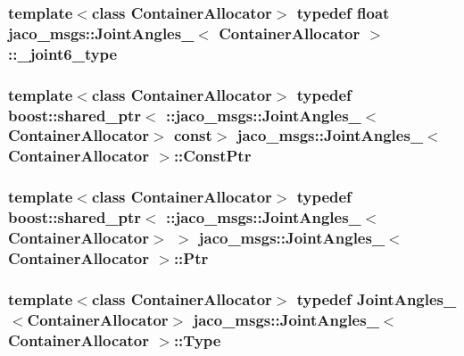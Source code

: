 \subsubsection[{\texorpdfstring{\+\_\+joint6\+\_\+type}{_joint6_type}}]{\setlength{\rightskip}{0pt plus 5cm}template$<$class Container\+Allocator$>$ typedef float {\bf jaco\+\_\+msgs\+::\+Joint\+Angles\+\_\+}$<$ Container\+Allocator $>$\+::{\bf \+\_\+joint6\+\_\+type}}\hypertarget{structjaco__msgs_1_1JointAngles___a298f6a826b48509fa922df955db3ac71}{}\label{structjaco__msgs_1_1JointAngles___a298f6a826b48509fa922df955db3ac71}
\subsubsection[{\texorpdfstring{Const\+Ptr}{ConstPtr}}]{\setlength{\rightskip}{0pt plus 5cm}template$<$class Container\+Allocator$>$ typedef boost\+::shared\+\_\+ptr$<$ \+::{\bf jaco\+\_\+msgs\+::\+Joint\+Angles\+\_\+}$<$Container\+Allocator$>$ const$>$ {\bf jaco\+\_\+msgs\+::\+Joint\+Angles\+\_\+}$<$ Container\+Allocator $>$\+::{\bf Const\+Ptr}}\hypertarget{structjaco__msgs_1_1JointAngles___a99a33fd1ec8ee206d19e905a8ffe989a}{}\label{structjaco__msgs_1_1JointAngles___a99a33fd1ec8ee206d19e905a8ffe989a}
\subsubsection[{\texorpdfstring{Ptr}{Ptr}}]{\setlength{\rightskip}{0pt plus 5cm}template$<$class Container\+Allocator$>$ typedef boost\+::shared\+\_\+ptr$<$ \+::{\bf jaco\+\_\+msgs\+::\+Joint\+Angles\+\_\+}$<$Container\+Allocator$>$ $>$ {\bf jaco\+\_\+msgs\+::\+Joint\+Angles\+\_\+}$<$ Container\+Allocator $>$\+::{\bf Ptr}}\hypertarget{structjaco__msgs_1_1JointAngles___a86d65786f9f73c0a62b47c104f6b9fa9}{}\label{structjaco__msgs_1_1JointAngles___a86d65786f9f73c0a62b47c104f6b9fa9}
\subsubsection[{\texorpdfstring{Type}{Type}}]{\setlength{\rightskip}{0pt plus 5cm}template$<$class Container\+Allocator$>$ typedef {\bf Joint\+Angles\+\_\+}$<$Container\+Allocator$>$ {\bf jaco\+\_\+msgs\+::\+Joint\+Angles\+\_\+}$<$ Container\+Allocator $>$\+::{\bf Type}}\hypertarget{structjaco__msgs_1_1JointAngles___a241d45fab0d4a6249e3ab293288ad9e8}{}\label{structjaco__msgs_1_1JointAngles___a241d45fab0d4a6249e3ab293288ad9e8}


